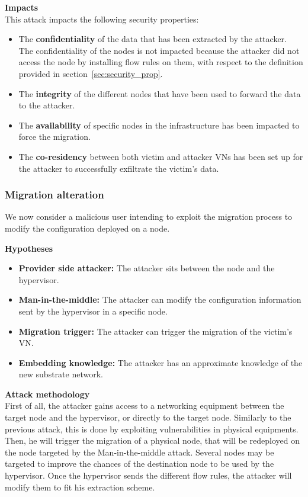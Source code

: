 \textbf{Impacts}\textbf{\\}
This attack impacts the following security properties:
\begin{itemize}
    \item The \textbf{confidentiality} of the data that has been extracted by the attacker.
The confidentiality of the nodes is not impacted because the attacker did not access the node by installing flow rules on them, with respect to the definition provided in section~\ref{sec:security_prop}.

    \item The \textbf{integrity} of the different nodes that have been used to forward the data to the attacker.
    
    \item The \textbf{availability} of specific nodes in the infrastructure has been impacted to force the migration.
    
    \item The \textbf{co-residency} between both victim and attacker VNs has been set up for the attacker to successfully exfiltrate the victim's data.
\end{itemize}

\subsubsection{Migration alteration}
We now consider a malicious user intending to exploit the migration process to modify the configuration deployed on a node.

\textbf{Hypotheses}
\begin{itemize}
    \item \textbf{Provider side attacker:} The attacker sits between the node and the hypervisor.
    \item \textbf{Man-in-the-middle:} The attacker can modify the configuration information sent by the hypervisor in a specific node.
    \item \textbf{Migration trigger:} The attacker can trigger the migration of the victim's VN.
    \item \textbf{Embedding knowledge:} The attacker has an approximate knowledge of the new substrate network.
\end{itemize}

\textbf{Attack methodology}\textbf{\\}
First of all, the attacker gains access to a networking equipment between the target node and the hypervisor, or directly to the target node. Similarly to the previous attack, this is done by exploiting vulnerabilities in physical equipments.
Then, he will trigger the migration of a physical node, that will be redeployed on the node targeted by the Man-in-the-middle attack. Several nodes may be targeted to improve the chances of the destination node to be used by the hypervisor.
Once the hypervisor sends the different flow rules, the attacker will modify them to fit his extraction scheme.

